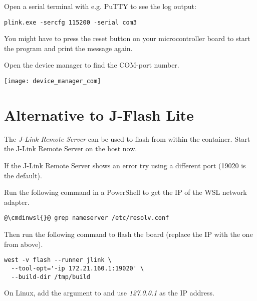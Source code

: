 Open a serial terminal with e.g. PuTTY to see the log output:

\begin{lstlisting}
plink.exe -sercfg 115200 -serial com3
\end{lstlisting}

You might have to press the reset button on your microcontroller board to start
the program and print the message again.

\begin{infobox}
  Open the device manager to find the COM-port number.
  \begin{center}
    \texttt{[image: device\_manager\_com]}
  \end{center}
\end{infobox}

\newpage

\appendix

\section{Alternative to J-Flash Lite}\label{jlinkremote}

The \emph{J-Link Remote Server} can be used to flash from within the container.
Start the J-Link Remote Server on the host now.

\begin{infobox}
  If the J-Link Remote Server shows an error try using a different port (19020
  is the default).
\end{infobox}

Run the following command in a PowerShell to get the IP of the WSL network
adapter.

\begin{lstlisting}
@\cmdinwsl{}@ grep nameserver /etc/resolv.conf
\end{lstlisting}

Then run the following command to flash the board (replace the IP with the one
from above).

\begin{lstlisting}
west -v flash --runner jlink \
  --tool-opt='-ip 172.21.160.1:19020' \
  --build-dir /tmp/build
\end{lstlisting}

\begin{infobox}
  On Linux, add the  argument to 
  and use \emph{127.0.0.1} as the IP address.
\end{infobox}

